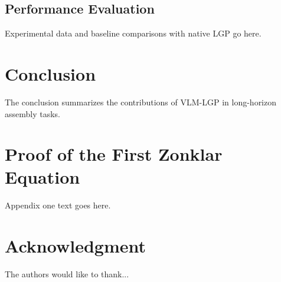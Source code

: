 \documentclass[journal]{IEEEtran}
\begin{document}
  \subsection{Performance Evaluation}
  Experimental data and baseline comparisons with native LGP go here.

  \section{Conclusion}
  The conclusion summarizes the contributions of VLM-LGP in long-horizon
  assembly tasks.

  \appendices
  \section{Proof of the First Zonklar Equation}
  Appendix one text goes here.

  \section*{Acknowledgment}
  The authors would like to thank...
\end{document}
